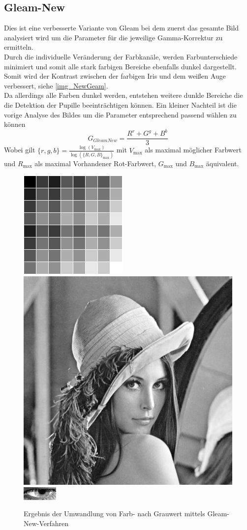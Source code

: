 \subsection{Gleam-New}
\label{gray_New}
Dies ist eine verbesserte Variante von Gleam bei dem zuerst das gesamte Bild analysiert wird um die Parameter für die jeweilige Gamma-Korrektur zu ermitteln.\\
Durch die individuelle Veränderung der Farbkanäle, werden Farbunterschiede minimiert und somit alle stark farbigen Bereiche ebenfalls dunkel dargestellt. Somit wird der Kontrast zwischen der farbigen Iris und dem weißen Auge verbessert, siehe \autoref{img_NewGeam}.\\
Da allerdings alle Farben dunkel werden, entstehen weitere dunkle Bereiche die die Detektion der Pupille beeinträchtigen können. Ein kleiner Nachteil ist die vorige Analyse des Bildes um die Parameter entsprechend passend wählen zu können
\[G_{Gleam New}=\dfrac{R^{r} + G^{g} + B^{b}}{3}\]
Wobei gilt $\{r,g,b\} = \frac{\log(V_{\max})}{\log(\{R,G,B\}_{\max})}$ mit $V_{\max}$ als maximal möglicher Farbwert und $R_{\max}$ als maximal Vorhandener Rot-Farbwert, $G_{\max}$ und $B_{\max}$ äquivalent.
\begin{figure}
	\centering
	\includegraphics[width=0.2\linewidth]{img/Farbkarte_New}
	\includegraphics[width=0.2\linewidth]{img/Lena_New}
	\includegraphics[width=0.2\linewidth]{img/Auge_NewGray}
	\caption{Ergebnis der Umwandlung von Farb- nach Grauwert mittels Gleam-New-Verfahren}
	\label{img_NewGeam}
\end{figure}

